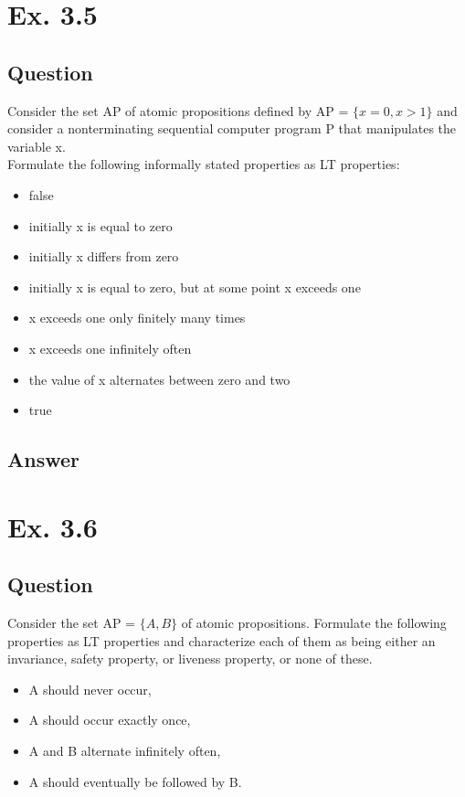 \documentclass[12pt]{article}
\begin{document}
\newpage

\section*{Ex. 3.5}
\subsection*{Question}
Consider the set AP of atomic propositions defined by AP = $\{x = 0, x > 1\}$
and consider a nonterminating sequential computer program P that manipulates the variable x.\\
Formulate the following informally stated properties as LT properties:
\begin{itemize}
	\item false
	\item initially x is equal to zero
	\item initially x differs from zero
	\item initially x is equal to zero, but at some point x exceeds one
	\item x exceeds one only finitely many times
	\item x exceeds one infinitely often
	\item the value of x alternates between zero and two
	\item true
\end{itemize}

\subsection*{Answer}

\newpage

\section*{Ex. 3.6}
\subsection*{Question}
Consider the set AP = $\{A,B\}$ of atomic propositions. Formulate the following
properties as LT properties and characterize each of them as being either an invariance, safety
property, or liveness property, or none of these.
\begin{itemize}
	\item A should never occur,
	\item A should occur exactly once,
	\item A and B alternate infinitely often,
	\item A should eventually be followed by B.
\end{itemize}
\end{document}
